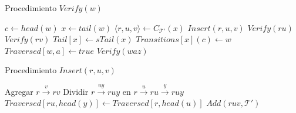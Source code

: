 \begin{algorithm}[h]
\small
\caption{Procedimiento $Verify(w)$}
\label{Algorithm:verify}
\begin{algorithmic}[1]
\State $c \gets head(w)$
\State $x \gets tail(w)$
\State $\langle r, u, v \rangle \gets C_{\mathcal{T}'}(x)$
	\State $Insert(r, u, v)$
			$Verify(ru)$
		\EndIf	
	\Else
			$Verify(rv)$
		\EndIf		
	\EndIf	
\EndIf
\State $Tail[x] \gets sTail(x)$
\State $Transitions[x](c) \gets w$
		\State $Traversed[w, a] \gets true$
			\State $Verify(waz)$
		\EndIf					
	\EndIf		
\EndFor
\Statex
\end{algorithmic}
  \vspace{-0.4cm}%
\end{algorithm}
\begin{algorithm}[h]
\small
\caption{Procedimiento $Insert(r,u,v)$}
\label{Algorithm:Insert}
\begin{algorithmic}[1]
	\State Agregar $r\overset{v}{\rightarrow}rv$
\Else
	\State Dividir $r\overset{uy}{\rightarrow}ruy$ en $r\overset{u}{\rightarrow}ru\overset{y}{\rightarrow}ruy$
	\State $Traversed[ru, head(y)] \gets Traversed[r,head(u)]$
		\State $Add(ruv, \mathcal{T}')$
	\EndIf	
\EndIf
\Statex
\end{algorithmic}
  \vspace{-0.4cm}%
\end{algorithm}

